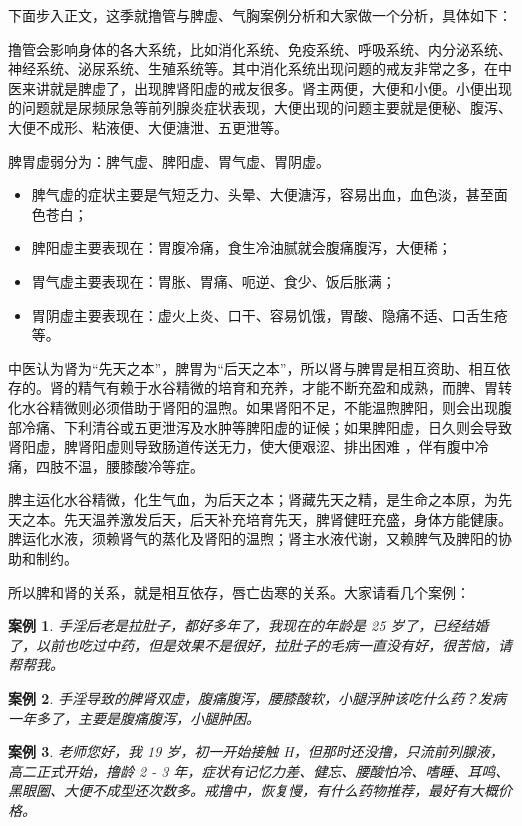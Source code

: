 \documentclass{ctexart}
\newtheorem{case}{案例}
\begin{document}
下面步入正文，这季就撸管与脾虚、气胸案例分析和大家做一个分析，具体如下：

撸管会影响身体的各大系统，比如消化系统、免疫系统、呼吸系统、内分泌系统、神经系统、泌尿系统、生殖系统等。其中消化系统出现问题的戒友非常之多，在中医来讲就是脾虚了，出现脾肾阳虚的戒友很多。肾主两便，大便和小便。小便出现的问题就是尿频尿急等前列腺炎症状表现，大便出现的问题主要就是便秘、腹泻、大便不成形、粘液便、大便溏泄、五更泄等。

脾胃虚弱分为：脾气虚、脾阳虚、胃气虚、胃阴虚。

\begin{itemize}
    \item 脾气虚的症状主要是气短乏力、头晕、大便溏泻，容易出血，血色淡，甚至面色苍白；
    \item 脾阳虚主要表现在：胃腹冷痛，食生冷油腻就会腹痛腹泻，大便稀；
    \item 胃气虚主要表现在：胃胀、胃痛、呃逆、食少、饭后胀满；
    \item 胃阴虚主要表现在：虚火上炎、口干、容易饥饿，胃酸、隐痛不适、口舌生疮等。
\end{itemize}

中医认为肾为“先天之本”，脾胃为“后天之本”，所以肾与脾胃是相互资助、相互依存的。肾的精气有赖于水谷精微的培育和充养，才能不断充盈和成熟，而脾、胃转化水谷精微则必须借助于肾阳的温煦。如果肾阳不足，不能温煦脾阳，则会出现腹部冷痛、下利清谷或五更泄泻及水肿等脾阳虚的证候；如果脾阳虚，日久则会导致肾阳虚，脾肾阳虚则导致肠道传送无力，使大便艰涩、排出困难 ，伴有腹中冷痛，四肢不温，腰膝酸冷等症。

脾主运化水谷精微，化生气血，为后天之本；肾藏先天之精，是生命之本原，为先天之本。先天温养激发后天，后天补充培育先天，脾肾健旺充盛，身体方能健康。脾运化水液，须赖肾气的蒸化及肾阳的温煦；肾主水液代谢，又赖脾气及脾阳的协助和制约。

所以脾和肾的关系，就是相互依存，唇亡齿寒的关系。大家请看几个案例：

\begin{case}
    手淫后老是拉肚子，都好多年了，我现在的年龄是 25 岁了，已经结婚了，以前也吃过中药，但是效果不是很好，拉肚子的毛病一直没有好，很苦恼，请帮帮我。
\end{case}

\begin{case}
    手淫导致的脾肾双虚，腹痛腹泻，腰膝酸软，小腿浮肿该吃什么药？发病一年多了，主要是腹痛腹泻，小腿肿困。
\end{case}

\begin{case}
    老师您好，我 19 岁，初一开始接触 H，但那时还没撸，只流前列腺液，高二正式开始，撸龄 2 - 3 年，症状有记忆力差、健忘、腰酸怕冷、嗜睡、耳鸣、黑眼圈、大便不成型还次数多。戒撸中，恢复慢，有什么药物推荐，最好有大概价格。
\end{case}
\end{document}
